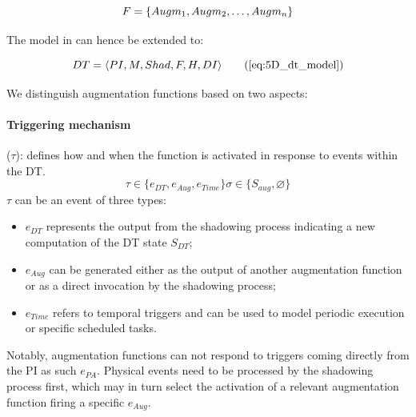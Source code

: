 \begin{equation}\label{eq:augm_set}
    F = \{Augm_{1}, Augm_{2}, \dots, Augm_{n}\}\\
\end{equation}

The model in  can hence be extended to: 

\begin{equation}
DT = \langle PI, M, Shad, F, H, DI \rangle
\tag{\ref{eq:5D_dt_model}}
\end{equation}

We distinguish augmentation functions based on two aspects:


\paragraph{Triggering mechanism} (\( \tau \)): defines how and when the function is activated in response to events within the \ac{DT}.
%
\begin{equation}
\tau \in \{ e_{DT}, e_{Aug}, e_{Time} \}  \sigma \in \{S_{aug}, \varnothing\}
\end{equation}
%
\(\tau\) can be an event of three types:
%
\begin{itemize}
\item \( e_{DT} \) represents the output from the shadowing process indicating a new computation of the \ac{DT} state \( S_{DT} \);
\item \( e_{Aug} \) can be generated either as the output of another augmentation function or as a direct invocation by the shadowing process;
\item \( e_{Time} \) refers to temporal triggers and can be used to model periodic execution or specific scheduled tasks.
\end{itemize}
%
Notably, augmentation functions can not respond to triggers coming directly from the \ac{PI} as such $e_{PA}$.
Physical events need to be processed by the shadowing process first, which may in turn select the activation of a relevant augmentation function firing a specific $e_{Aug}$.



